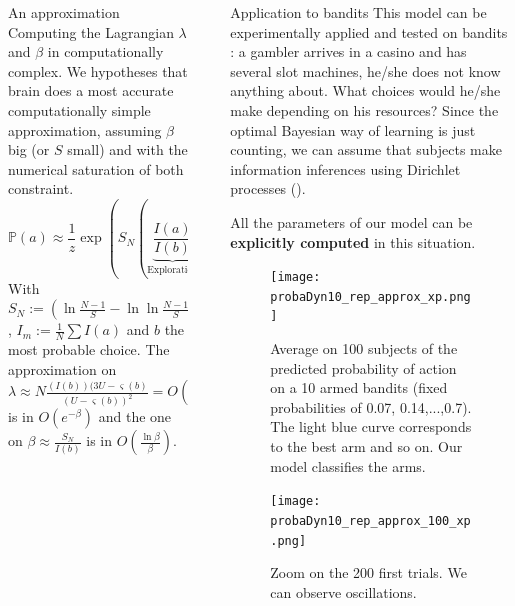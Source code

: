 \documentclass[final]{beamer}
\newcommand{\Proba}{\mathbb{P}}
\newlength{\sepwidth}
\newlength{\colwidth}
\newcommand{\separatorcolumn}{\begin{column}{\sepwidth}\end{column}}
\begin{document}
\begin{frame}[t]
\begin{columns}[t]
\begin{column}{\colwidth}
 \begin{block}{An approximation}
 Computing the Lagrangian $\lambda$ and $\beta$ in computationally complex. We hypotheses that brain does a most accurate computationally simple approximation, assuming $\beta$ big (or $S$ small) and with the numerical saturation of both constraint.
\begin{equation}
\Proba (a) \approx \frac{1}{z} \exp \left( S_N \left( \underbrace{\frac{I (a)}{I(b) }}_{\text{Exploration}} - \underbrace{N \varsigma (a) \frac{ 3U - \varsigma(b)}{ \left( U - \varsigma (b) \right)^2}}_{Exploitation} \right) \right)
\end{equation}
With $S_N :=  \left( \ln \frac{N-1}{S} - \ln  \ln \frac{N-1}{S} \right)$,
$I_{m} := \frac{1}{N} \sum I(a) $ and $b$ the most probable choice. 
The approximation on $\lambda \approx N \frac{(I(b))(3U - \varsigma (b)}{ \left( U - \varsigma(b) \right) ^2} = O\left( 3 \frac{ I(b) - I_m}{U} \right)$ is in 
$O \left(e^ {- \beta} \right)$ and the one on $\beta \approx \frac{S_N}{I(b)}$ is in $O \left( \frac{\ln \beta}{\beta} \right)$.
 
 \end{block}
 
\end{column}
\separatorcolumn
\begin{column}{\colwidth}
 \begin{block}{Application to bandits}
  This model can be experimentally applied and tested on bandits : a gambler arrives in a casino and has several slot machines, he/she does not know anything about. What choices would he/she make depending on his resources? Since the optimal Bayesian way of learning is just counting, we can assume that subjects make information inferences using Dirichlet processes (\cite{domenech2020neural}). 
  
All the parameters of our model can be \textbf{explicitly computed} in this situation.
  
      \begin{figure}
      \centering
      \texttt{[image: probaDyn10\_rep\_approx\_xp.png]} 
      \caption{Average on 100 subjects of the predicted probability of action on a 10 armed bandits (fixed probabilities of 0.07, 0.14,...,0.7). The  light blue curve corresponds to the best arm and so on. Our model classifies the arms.}
    \end{figure}
    
          \begin{figure}
      \centering
      \texttt{[image: probaDyn10\_rep\_approx\_100\_xp.png]} 
      \caption{Zoom on the 200 first trials. We can observe oscillations.}
    \end{figure}
    

\end{block}
\end{column}
\end{columns}
\end{frame}
\end{document}
